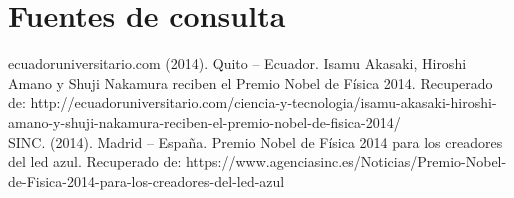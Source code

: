 \documentclass{article}
\begin{document}
\section{Fuentes de consulta}
ecuadoruniversitario.com  (2014). Quito – Ecuador. Isamu Akasaki, Hiroshi Amano y Shuji Nakamura reciben el Premio Nobel de Física 2014.  Recuperado de: http://ecuadoruniversitario.com/ciencia-y-tecnologia/isamu-akasaki-hiroshi-amano-y-shuji-nakamura-reciben-el-premio-nobel-de-fisica-2014/\\

SINC. (2014). Madrid – España. Premio Nobel de Física 2014 para los creadores del led azul. Recuperado de: https://www.agenciasinc.es/Noticias/Premio-Nobel-de-Fisica-2014-para-los-creadores-del-led-azul 
\end{document}

